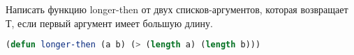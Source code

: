 Написать функцию longer-then от двух списков-аргументов, которая возвращает Т,
если первый аргумент имеет большую длину.

\begin{lstlisting}[language=Lisp]
(defun longer-then (a b) (> (length a) (length b)))
\end{lstlisting}

